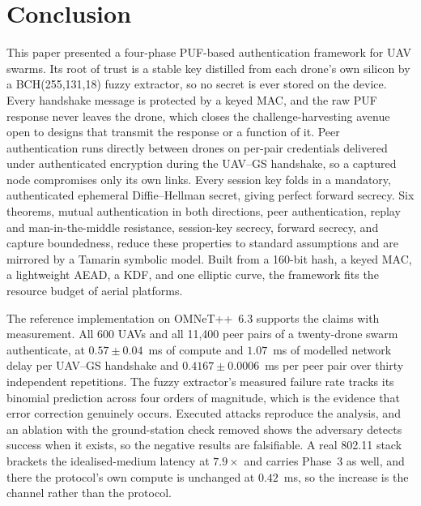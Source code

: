 \documentclass[journal]{IEEEtran}
\begin{document}
\section{Conclusion}
\label{sec:concl}

This paper presented a four-phase PUF-based authentication framework for UAV
swarms. Its root of trust is a stable key distilled from each drone's own
silicon by a BCH(255,131,18) fuzzy extractor, so no secret is ever stored on
the device. Every handshake message is protected by a keyed MAC, and the raw
PUF response never leaves the drone, which closes the challenge-harvesting
avenue open to designs that transmit the response or a function of it. Peer
authentication runs directly between drones on per-pair credentials delivered
under authenticated encryption during the UAV--GS handshake, so a captured node
compromises only its own links. Every session key folds in a mandatory,
authenticated ephemeral Diffie--Hellman secret, giving perfect forward secrecy.
Six theorems, mutual authentication in both directions, peer authentication,
replay and man-in-the-middle resistance, session-key secrecy, forward secrecy,
and capture boundedness, reduce these properties to standard assumptions and
are mirrored by a Tamarin symbolic model. Built from a 160-bit hash, a keyed
MAC, a lightweight AEAD, a KDF, and one elliptic curve, the framework fits the
resource budget of aerial platforms.

The reference implementation on OMNeT++~6.3 supports the claims with
measurement. All 600 UAVs and all 11{,}400 peer pairs of a twenty-drone swarm
authenticate, at $0.57 \pm 0.04$~ms of compute and $1.07$~ms of modelled
network delay per UAV--GS handshake and $0.4167 \pm 0.0006$~ms per peer pair
over thirty independent
repetitions. The fuzzy extractor's measured failure rate tracks its binomial
prediction across four orders of magnitude, which is the evidence that error
correction genuinely occurs. Executed attacks reproduce the analysis, and an
ablation with the ground-station check removed shows the adversary detects
success when it exists, so the negative results are falsifiable. A real 802.11
stack brackets the idealised-medium latency at $7.9\times$ and carries Phase~3
as well, and there the protocol's own compute is unchanged at $0.42$~ms, so the
increase is the channel rather than the protocol.
\end{document}
